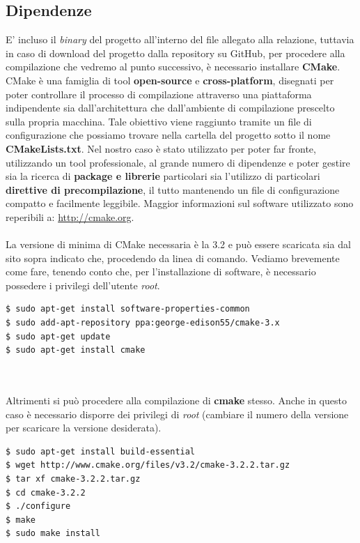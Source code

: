 \documentclass[italian]{tktltiki2}
\begin{document}
\subsection{Dipendenze}
E' incluso il \emph{binary} del progetto all'interno del file allegato alla relazione, tuttavia in caso di download del progetto dalla repository su GitHub, per procedere alla compilazione che vedremo al punto successivo, è necessario installare \textbf{CMake}.\\
CMake è una famiglia di tool \textbf{open-source} e \textbf{cross-platform}, disegnati per poter controllare il processo di compilazione attraverso una piattaforma indipendente sia dall'architettura che dall'ambiente di compilazione prescelto sulla propria macchina. Tale obiettivo viene raggiunto tramite un file di configurazione che possiamo trovare nella cartella del progetto sotto il nome \textbf{CMakeLists.txt}. Nel nostro caso è stato utilizzato per poter far fronte, utilizzando un tool professionale, al grande numero di dipendenze e poter gestire sia la ricerca di \textbf{package e librerie} particolari sia l'utilizzo di particolari \textbf{direttive di precompilazione}, il tutto mantenendo un file di configurazione compatto e facilmente leggibile. Maggior informazioni sul software utilizzato sono reperibili a: \url{http://cmake.org}. \\\\
La versione di minima di CMake necessaria è la 3.2 e può essere scaricata sia dal sito sopra indicato che, procedendo da linea di comando. Vediamo brevemente come fare, tenendo conto che, per l'installazione di software, è necessario possedere i privilegi dell'utente \emph{root}.
\begin{lstlisting}
$ sudo apt-get install software-properties-common
$ sudo add-apt-repository ppa:george-edison55/cmake-3.x
$ sudo apt-get update
$ sudo apt-get install cmake
	
	
\end{lstlisting}
Altrimenti si può procedere alla compilazione di \textbf{cmake} stesso. Anche in questo caso è necessario disporre dei privilegi di \emph{root} (cambiare il numero della versione per scaricare la versione desiderata).
\begin{lstlisting}
$ sudo apt-get install build-essential
$ wget http://www.cmake.org/files/v3.2/cmake-3.2.2.tar.gz
$ tar xf cmake-3.2.2.tar.gz
$ cd cmake-3.2.2
$ ./configure
$ make
$ sudo make install
	
\end{lstlisting}
\end{document}
